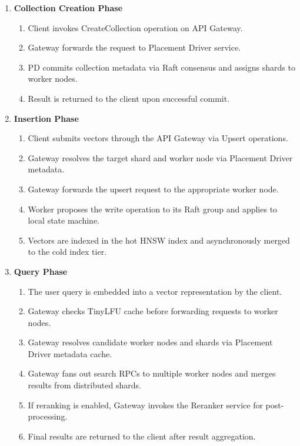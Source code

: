 \begin{enumerate}
    \item \textbf{Collection Creation Phase}
    \begin{enumerate}
        \item Client invokes CreateCollection operation on API Gateway.
        \item Gateway forwards the request to Placement Driver service.
        \item PD commits collection metadata via Raft consensus and assigns shards to worker nodes.
        \item Result is returned to the client upon successful commit.
    \end{enumerate}

    \item \textbf{Insertion Phase}
    \begin{enumerate}
        \item Client submits vectors through the API Gateway via Upsert operations.
        \item Gateway resolves the target shard and worker node via Placement Driver metadata.
        \item Gateway forwards the upsert request to the appropriate worker node.
        \item Worker proposes the write operation to its Raft group and applies to local state machine.
        \item Vectors are indexed in the hot HNSW index and asynchronously merged to the cold index tier.
    \end{enumerate}

    \item \textbf{Query Phase}
    \begin{enumerate}
        \item The user query is embedded into a vector representation by the client.
        \item Gateway checks TinyLFU cache before forwarding requests to worker nodes.
        \item Gateway resolves candidate worker nodes and shards via Placement Driver metadata cache.
        \item Gateway fans out search RPCs to multiple worker nodes and merges results from distributed shards.
        \item If reranking is enabled, Gateway invokes the Reranker service for post-processing.
        \item Final results are returned to the client after result aggregation.
    \end{enumerate}


\end{enumerate}
